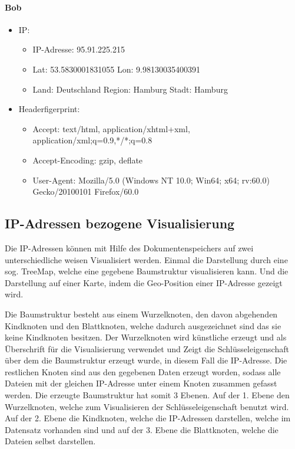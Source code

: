 \documentclass[
    fontsize=12pt,
    headings=small,
    parskip=half,           %
    bibliography=totoc,
    numbers=noenddot,       %
    open=any,               %
    ]{scrreprt}
\begin{document}
\paragraph{Bob}
\begin{itemize}
  \item IP: 
  \begin{itemize}
  \item IP-Adresse: 95.91.225.215
  \item Lat: 53.5830001831055 Lon: 9.98130035400391
  \item Land: Deutschland Region: Hamburg Stadt: Hamburg
  \end{itemize}
  \item Headerfigerprint:  
  \begin{itemize}
  \item Accept: text/html, application/xhtml+xml, application/xml;q=0.9,*/*;q=0.8
  \item Accept-Encoding: gzip, deflate
  \item User-Agent: Mozilla/5.0 (Windows NT 10.0; Win64; x64; rv:60.0) Gecko/20100101 Firefox/60.0
  \end{itemize}
\end{itemize}


\newpage
    \subsection{IP-Adressen bezogene Visualisierung} \label{ipVis}
Die IP-Adressen können mit Hilfe des Dokumentenspeichers auf zwei unterschiedliche weisen Visualisiert werden. 
Einmal die Darstellung durch eine sog. TreeMap, welche eine gegebene Baumstruktur visualisieren kann. 
Und die Darstellung auf einer Karte, indem die Geo-Position einer IP-Adresse gezeigt wird.

Die Baumstruktur besteht aus einem Wurzelknoten, den davon abgehenden Kindknoten und den Blattknoten, welche dadurch ausgezeichnet sind das sie keine Kindknoten besitzen. 
Der Wurzelknoten wird künstliche erzeugt und als Überschrift für die Visualisierung verwendet und Zeigt die Schlüsseleigenschaft über dem die Baumstruktur erzeugt wurde, in diesem Fall die IP-Adresse.
Die restlichen Knoten sind aus den gegebenen Daten erzeugt worden, sodass alle Dateien mit der gleichen IP-Adresse unter einem Knoten zusammen gefasst werden.
Die erzeugte Baumstruktur hat somit 3 Ebenen. 
Auf der 1. Ebene den Wurzelknoten, welche zum Visualisieren der Schlüsseleigenschaft benutzt wird. 
Auf der 2. Ebene die Kindknoten, welche die IP-Adressen darstellen, welche im Datensatz vorhanden sind und auf der 3. Ebene die Blattknoten, welche die Dateien selbst darstellen.
\end{document}
